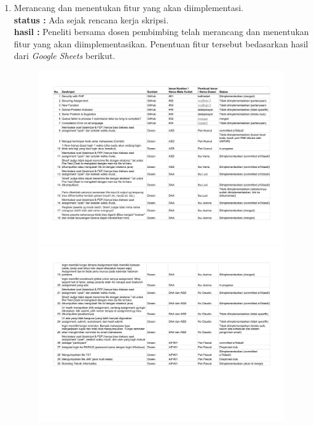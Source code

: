 \documentclass[a4paper,twoside]{article}
\begin{document}
\begin{enumerate}
		\item Merancang dan menentukan fitur yang akan diimplementasi.\\
		{\bf status :} Ada sejak rencana kerja skripsi.\\
		{\bf hasil :} Peneliti bersama dosen pembimbing telah merancang dan menentukan fitur yang akan diimplementasikan. Penentuan fitur tersebut bedasarkan hasil dari \textit{Google Sheets} berikut. 
		
		\begin{figure}[H]
			\centering  
			\includegraphics[scale=0.2]{pdf1}
			
			\includegraphics[scale=0.2]{pdf2}
		\end{figure}
		

\end{enumerate}
\end{document}
